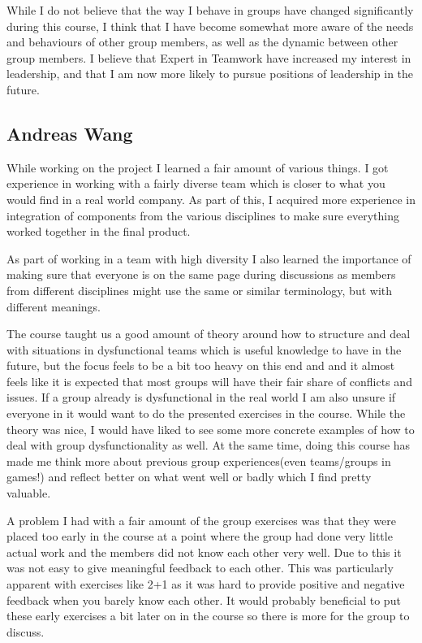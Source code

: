 While I do not believe that the way I behave in groups have changed significantly during this course, I think that I have become somewhat more aware of the needs and behaviours of other group members, as well as the dynamic between other group members. I believe that Expert in Teamwork have increased my interest in leadership, and that I am now more likely to pursue positions of leadership in the future. 

\subsection{Andreas Wang}
While working on the project I learned a fair amount of various things. I got experience in working with a fairly diverse team which is closer to what you would find in a real world company. As part of this, I acquired more experience in integration of components from the various disciplines to make sure everything worked together in the final product. 

As part of working in a team with high diversity I also learned the importance of making sure that everyone is on the same page during discussions as members from different disciplines might use the same or similar terminology, but with different meanings. 

The course taught us a good amount of theory around how to structure and deal with situations in dysfunctional teams which is useful knowledge to have in the future, but the focus feels to be a bit too heavy on this end and and it almost feels like it is expected that most groups will have their fair share of conflicts and issues. If a group already is dysfunctional in the real world I am also unsure if everyone in it would want to do the presented exercises in the course. While the theory was nice, I would have liked to see some more concrete examples of how to deal with group dysfunctionality as well. At the same time, doing this course has made me think more about previous group experiences(even teams/groups in games!) and reflect better on what went well or badly which I find pretty valuable. 

A problem I had with a fair amount of the group exercises was that they were placed too early in the course at a point where the group had done very little actual work and the members did not know each other very well. Due to this it was not easy to give meaningful feedback to each other. This was particularly apparent with exercises like 2+1 as it was hard to provide positive and negative feedback when you barely know each other. It would probably beneficial to put these early exercises a bit later on in the course so there is more for the group to discuss. 

